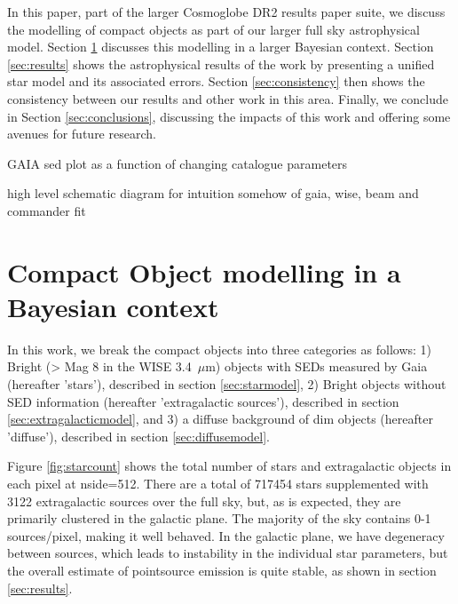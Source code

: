 \documentclass{aa}
\begin{document}
In this paper, part of the larger Cosmoglobe DR2 results paper suite, we discuss the modelling of compact objects as part of our larger full sky astrophysical model. Section \ref{sec:models} discusses this modelling in a larger Bayesian context. Section \ref{sec:results} shows the astrophysical results of the work by presenting a unified star model and its associated errors. Section \ref{sec:consistency} then shows the consistency between our results and other work in this area. Finally, we conclude in Section \ref{sec:conclusions}, discussing the impacts of this work and offering some avenues for future research.

GAIA sed plot as a function of changing catalogue parameters

high level schematic diagram for intuition somehow of gaia, wise, beam and commander fit


\section{Compact Object modelling in a Bayesian context}
\label{sec:models}

In this work, we break the compact objects into three categories as follows: 1) Bright (> Mag 8 in the WISE 3.4 $\,\mu$m) objects with SEDs measured by Gaia (hereafter 'stars'), described in section \ref{sec:starmodel}, 2) Bright objects without SED information (hereafter 'extragalactic sources'), described in section \ref{sec:extragalacticmodel}, and 3) a diffuse background of dim objects (hereafter 'diffuse'), described in section \ref{sec:diffusemodel}.



Figure \ref{fig:starcount} shows the total number of stars and extragalactic objects in each pixel at nside=512. There are a total of 717454 stars supplemented with 3122 extragalactic sources over the full sky, but, as is expected, they are primarily clustered in the galactic plane. The majority of the sky contains 0-1 sources/pixel, making it well behaved. In the galactic plane, we have degeneracy between sources, which leads to instability in the individual star parameters, but the overall estimate of pointsource emission is quite stable, as shown in section \ref{sec:results}.
\end{document}
